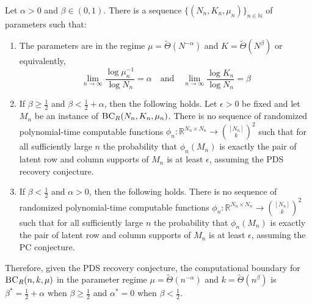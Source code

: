 \begin{theorem} \label{thm:bcrec}
Let $\alpha > 0$ and $\beta \in (0, 1)$. There is a sequence $\{ (N_n, K_n, \mu_n) \}_{n \in \mathbb{N}}$ of parameters such that:
\begin{enumerate}
\item The parameters are in the regime $\mu = \tilde{\Theta}(N^{-\alpha})$ and $K = \tilde{\Theta}(N^\beta)$ or equivalently,
$$\lim_{n \to \infty} \frac{\log \mu_n^{-1}}{\log N_n} = \alpha \quad \text{and} \quad \lim_{n \to \infty} \frac{\log K_n}{\log N_n} = \beta$$
\item If $\beta \ge \frac{1}{2}$ and $\beta < \frac{1}{2} + \alpha$, then the following holds. Let $\epsilon > 0$ be fixed and let $M_n$ be an instance of $\textsc{BC}_R(N_n, K_n, \mu_n)$. There is no sequence of randomized polynomial-time computable functions $\phi_n : \mathbb{R}^{N_n \times N_n} \to \binom{[N_n]}{k}^2$ such that for all sufficiently large $n$ the probability that $\phi_n(M_n)$ is exactly the pair of latent row and column supports of $M_n$ is at least $\epsilon$, assuming the PDS recovery conjecture.
\item If $\beta < \frac{1}{2}$ and $\alpha > 0$, then the following holds. There is no sequence of randomized polynomial-time computable functions $\phi_n : \mathbb{R}^{N_n \times N_n} \to \binom{[N_n]}{k}^2$ such that for all sufficiently large $n$ the probability that $\phi_n(M_n)$ is exactly the pair of latent row and column supports of $M_n$ is at least $\epsilon$, assuming the PC conjecture.
\end{enumerate}
Therefore, given the PDS recovery conjecture, the computational boundary for $\textsc{BC}_R(n, k, \mu)$ in the parameter regime $\mu = \tilde{\Theta}(n^{-\alpha})$ and $k = \tilde{\Theta}(n^\beta)$ is $\beta^* = \frac{1}{2} + \alpha$ when $\beta \ge \frac{1}{2}$ and $\alpha^* = 0$ when $\beta < \frac{1}{2}$.
\end{theorem}

